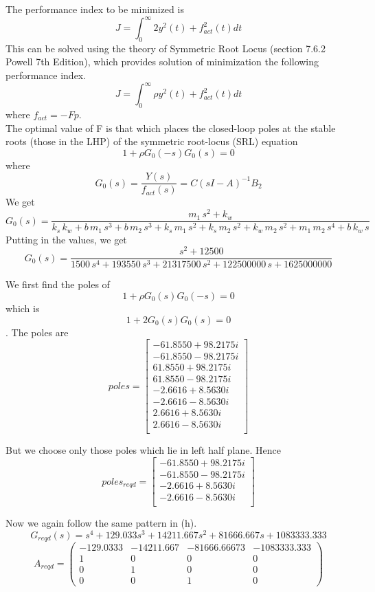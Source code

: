 \documentclass{article}
\newenvironment{answer}[2][Answer]{\begin{trivlist}
  \item[\hskip \labelsep {\bfseries #1}\hskip \labelsep {\bfseries #2:}]}{\end{trivlist}}
\begin{document}
\begin{answer}l
  The performance index to be minimized is
  $$J = \int_0^\infty 2y^2(t) + f_{act}^2(t)dt$$
  This can be solved using the theory of Symmetric Root Locus (section 7.6.2 Powell 7th Edition), which provides solution of minimization the following performance index.
  $$J = \int_0^\infty \rho y^2(t) + f_{act}^2(t)dt$$
  where $f_{act} = -Fp$.\\
  The optimal value of F is that which places the closed-loop poles at the stable roots (those in the LHP) of the symmetric root-locus (SRL) equation
  $$1 + \rho G_0(-s)G_0(s) = 0$$
  where
  $$G_0(s) = \frac{Y(s)}{f_{act}(s)} = C(sI - A)^{-1}B_2$$
  We get
  $$G_0(s) = \frac{m_{1}\, s^2 + k_{w}}{k_{s}\, k_{w} + b\, m_{1}\, s^3 + b\, m_{2}\, s^3 + k_{s}\, m_{1}\, s^2 + k_{s}\, m_{2}\, s^2 + k_{w}\, m_{2}\, s^2 + m_{1}\, m_{2}\, s^4 + b\, k_{w}\, s}$$
  Putting in the values, we get
  $$G_0(s) = \frac{s^2 + 12500}{1500\, s^4 + 193550\, s^3 + 21317500\, s^2 + 122500000\, s + 1625000000}$$

  We first find the poles of $$ 1 + \rho G_0(s) G_0(-s) = 0$$
  which is $$1 + 2G_0(s)G_0(s) = 0$$.
  The poles are
  \[
    poles =
    \begin{bmatrix}
      -61.8550 +98.2175i\\
      -61.8550 -98.2175i\\
      61.8550 +98.2175i\\
      61.8550 -98.2175i\\
      -2.6616 + 8.5630i\\
      -2.6616 - 8.5630i\\
      2.6616 + 8.5630i\\
      2.6616 - 8.5630i\\
    \end{bmatrix}
  \]

  But we choose only those poles which lie in left half plane. Hence
  \[
    poles_{reqd} =
    \begin{bmatrix}
      
      -61.8550 +98.2175i\\
      -61.8550 -98.2175i\\
      -2.6616 + 8.5630i\\
      -2.6616 - 8.5630i\\
    \end{bmatrix}
  \]

  Now we again follow the same pattern in (h).
  $$G_{reqd}(s) = s^4 + 129.033s^3 + 14211.667s^2 + 81666.667s + 1083333.333$$
  $$A_{reqd} = \left(\begin{array}{cccc} -129.0333 & -14211.667 & -81666.66673 & -1083333.333 \\ 1 & 0 & 0 & 0\\ 0 & 1 & 0 & 0\\ 0 & 0 & 1 & 0 \end{array}\right)$$


\end{answer}
\end{document}

